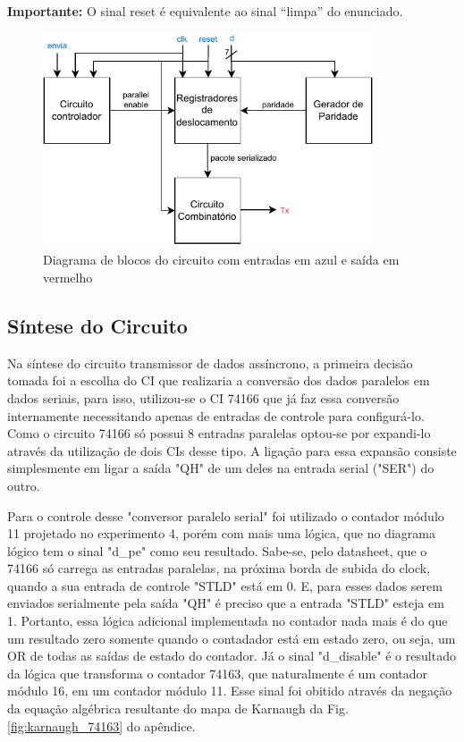 \documentclass[a4,12pt]{horizon-theme}
\begin{document}
{\bf Importante:} O sinal reset é equivalente ao sinal ``limpa'' do enunciado.

\begin{figure}[!ht]
    \centering
    \includegraphics[width=0.87\textwidth]{blocos}
    \caption{Diagrama de blocos do circuito com entradas em azul e saída em vermelho}
    \label{fig:blocos}
\end{figure}

\subsection{Síntese do Circuito} %
\label{sec:sintese}

Na síntese do circuito transmissor de dados assíncrono, a primeira decisão tomada foi a escolha do CI que realizaria a conversão dos dados paralelos em dados seriais, para isso, utilizou-se o CI 74166 que já faz essa conversão internamente necessitando apenas de entradas de controle para configurá-lo. Como o circuito 74166 só possui 8 entradas paralelas optou-se por expandi-lo através da utilização de dois CIs desse tipo. A ligação para essa expansão consiste simplesmente em ligar a saída "QH" de um deles na entrada serial ("SER") do outro. 

Para o controle desse "conversor paralelo serial" foi utilizado o contador módulo 11 projetado no experimento 4, porém com mais uma lógica, que no diagrama lógico tem o sinal "d\_pe" como seu resultado. Sabe-se, pelo datasheet, que o 74166 só carrega as entradas paralelas, na próxima borda de subida do clock, quando a sua entrada de controle "STLD" está em 0. E, para esses dados serem enviados serialmente pela saída "QH" é preciso que a entrada "STLD" esteja em 1. Portanto, essa lógica adicional implementada no contador nada mais é do que um resultado zero somente quando o contadador está em estado zero, ou seja, um OR de todas as saídas de estado do contador. Já o sinal "d\_disable" é o resultado da lógica que transforma o contador 74163, que naturalmente é um contador módulo 16, em um contador módulo 11. Esse sinal foi obitido através da negação da equação algébrica resultante do mapa de Karnaugh da Fig.\ref{fig:karnaugh_74163}
do apêndice.
\end{document}
